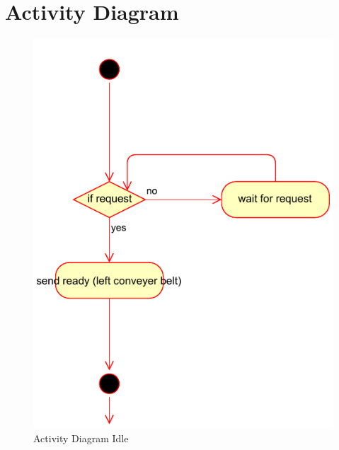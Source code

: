 \documentclass[a4paper,12pt,twoside]{scrreprt}
\begin{document}
\newpage

\section{Activity Diagram}
\label{chap:Activity_Diagram}

\begin{figure}[H]
	\centering
	\includegraphics[width=\textwidth,height=\textheight,keepaspectratio]{activityDiagram/activitychartIdleState.pdf}
	\caption[Activity Diagram Idle]{Activity Diagram Idle}
	\label{fig:ActivityDiagramIdle}
\end{figure}
\end{document}
